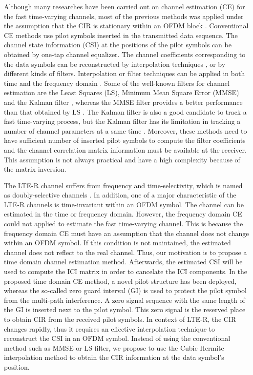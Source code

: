 \documentclass[AMA]{WileyNJD-v1}
\begin{document}
Although many researches have been carried out on channel estimation (CE) for the fast time-varying channels, most of the previous methods was applied under the assumption that the CIR is stationary within an OFDM block \cite {Hu2003, Tang2007, Park2005}. Conventional CE methods use pilot symbols inserted in the transmitted data sequence. The channel state information (CSI) at the positions of the pilot symbols can be obtained by one-tap channel equalizer. The channel coefficients corresponding to the data symbols can be reconstructed by interpolation techniques \cite{Cavers1991, Lau1994}, or by different kinds of filters. Interpolation or filter techniques can be applied in both time and the frequency domain \cite{Mostofi2005,Hijazi2009,Simko2011}. Some of the well-known filters for channel estimation are the  Least Squares (LS), Minimum Mean Square Error (MMSE)  \cite{Mostofi2005,Hijazi2009,Simko2011} and the Kalman filter \cite{Kaufman1983}, whereas the MMSE filter provides a better performance than that obtained by LS \cite{Edfors1998}. The Kalman filter is also a good candidate to track a fast time-varying process, but the Kalman filter has its limitation in tracking a number of channel parameters at a same time \cite{Kaufman1983}. Moreover, these methods need to have sufficient number of inserted pilot symbols to compute the filter coefficients and the channel correlation matrix information must be available at the receiver. This assumption is not always practical and have a high complexity because of the matrix inversion. 

The LTE-R channel suffers from frequency and time-selectivity, which is named as doubly-selective channels \cite{Adireddy2002,Fan2014}. In addition, one of a major characteristic of the LTE-R channels is time-invariant within an OFDM symbol. The channel can be estimated in the time or frequency domain. However, the frequency domain CE could not applied to estimate the fast time-varying channel. This is because the frequency  domain CE must have an assumption that the channel does not change within an OFDM symbol. If this condition is not maintained, the estimated channel does not reflect to the real channel. Thus, our motivation is to propose a time domain channel estimation method. Afterwards, the estimated CSI will be used to compute the ICI matrix in order to cancelate the ICI components. In the proposed time domain CE method, a novel pilot structure has been deployed, whereas the so-called zero guard interval (GI) is used to protect the pilot symbol from the multi-path interference. A zero signal sequence with the same length of the GI is inserted next to the pilot symbol. This zero signal is the reserved place  to obtain CIR from the received pilot symbols. In context of LTE-R, the CIR changes rapidly, thus it requires an effective interpolation technique to reconstruct the CSI in an OFDM symbol. Instead of using the conventional method such as MMSE or LS filter, we propose to use the Cubic Hermite interpolation method to obtain the CIR information at the data symbol's position.
\end{document}

